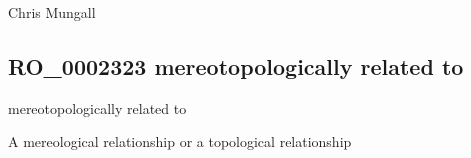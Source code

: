 \documentclass[letterpaper,10pt,english]{sphinxmanual}
\begin{document}
\begin{sphinxShadowBox}

\sphinxAtStartPar
{}
\end{sphinxShadowBox}

\begin{sphinxShadowBox}

\sphinxAtStartPar
Chris Mungall
\end{sphinxShadowBox}
\begin{quote}

\ignorespaces \end{quote}


\subsection{RO\_0002323 \sphinxhyphen{} mereotopologically related to}
\label{\detokenize{doc-RO_0002323:ro-0002323-mereotopologically-related-to}}\label{\detokenize{doc-RO_0002323:index-0}}\label{\detokenize{doc-RO_0002323::doc}}
\begin{sphinxShadowBox}

\sphinxAtStartPar
mereotopologically related to
\end{sphinxShadowBox}

\begin{sphinxShadowBox}

\sphinxAtStartPar
{}
\end{sphinxShadowBox}

\begin{sphinxShadowBox}

\sphinxAtStartPar
A mereological relationship or a topological relationship
\end{sphinxShadowBox}

\begin{sphinxShadowBox}

\sphinxAtStartPar
{}
\end{sphinxShadowBox}
\end{document}
